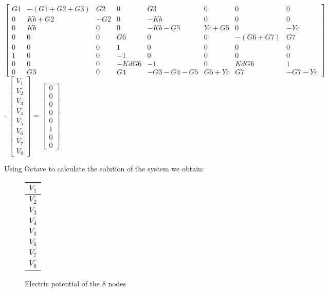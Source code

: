 \fontsize{8}{12}\selectfont
$\begin{bmatrix}
    G1 & -(G1+G2+G3) & G2 & 0 & G3 & 0 & 0 & 0 \\
    0 & Kb+G2 & -G2 & 0 & -Kb & 0 & 0 & 0 \\
    0 & Kb & 0 & 0 & -Kb-G5 & Yc+G5 & 0 & -Yc \\
    0 & 0 & 0 & G6 & 0 & 0 & -(G6+G7) & G7 \\
    0 & 0 & 0 & 1 & 0 & 0 & 0 & 0 \\
    1 & 0 & 0 & -1 & 0 & 0 & 0 & 0 \\
    0 & 0 & 0 & -KdG6 & -1 & 0 & KdG6 & 1 \\
    0 & G3 & 0 & G4 & -G3-G4-G5 & G5+Yc & G7 & -G7-Yc
\end{bmatrix}$ $\cdot$
$\begin{bmatrix}
     V_1 \\V_2 \\V_3 \\V_4 \\V_5 \\V_6 \\V_7 \\V_8
\end{bmatrix}$ =
$\begin{bmatrix}
    0 \\0 \\0 \\0 \\0 \\1 \\0 \\0 
\end{bmatrix}$

\fontsize{11}{12}\selectfont
\vspace{20pt}
Using Octave to calculate the solution of the system we obtain:

\begin{figure}[h]
	\begin{center}
	    \begin{minipage}{.3\textwidth}
		\flushright
		\begin{tabular}{|c|}
		    \hline
		    $V_1$ \\
		    \hline
		    $V_2$ \\
		    \hline
		    $V_3$ \\
		    \hline
		    $V_4$ \\
		    \hline
		    $V_5$ \\
		    \hline
		    $V_6$ \\
		    \hline
		    $V_7$ \\
		    \hline
		    $V_8$ \\
		    \hline
		\end{tabular}
	    \end{minipage}
	    \hspace{-8pt}
	    \begin{minipage}{.3\textwidth}
		\flushleft
		
	    \end{minipage}
	\end{center}
	\caption{Electric potential of the 8 nodes}
	\label{theory_voltages}
\end{figure}

\newpage
